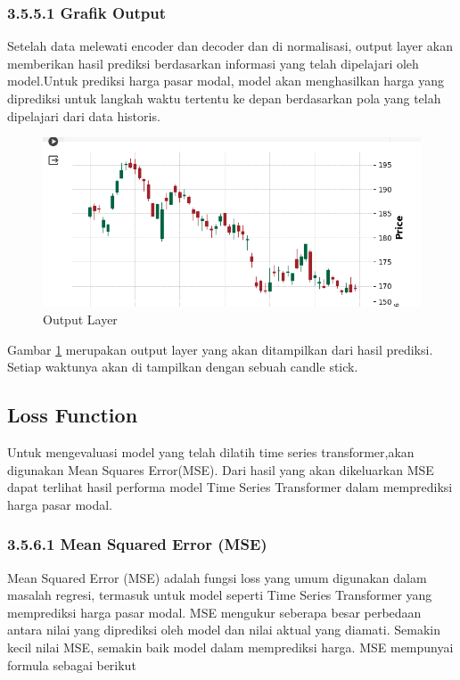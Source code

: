 \subsubsection*{3.5.5.1 Grafik Output}
Setelah data melewati encoder dan decoder dan di normalisasi, output layer akan memberikan hasil prediksi berdasarkan informasi yang telah dipelajari oleh model.Untuk prediksi harga pasar modal, model akan menghasilkan harga yang diprediksi untuk langkah waktu tertentu ke depan berdasarkan pola yang telah dipelajari dari data historis.

\begin{figure} [H] \centering
    \includegraphics[scale=0.6]{gambar/outputlay.png} 
    \caption{Output Layer}
    \label{fig:outputgraf}
\end{figure}

Gambar \ref{fig:outputgraf} merupakan output layer yang akan ditampilkan dari hasil prediksi. Setiap waktunya akan di tampilkan dengan sebuah candle stick.

\subsection{Loss Function}
Untuk mengevaluasi model yang telah dilatih time series transformer,akan digunakan Mean Squares Error(MSE). Dari hasil yang akan dikeluarkan MSE dapat terlihat hasil performa model Time Series Transformer dalam memprediksi harga pasar modal.

\subsubsection*{3.5.6.1 Mean Squared Error (MSE)}
Mean Squared Error (MSE) adalah fungsi loss yang umum digunakan dalam masalah regresi, termasuk untuk model seperti Time Series Transformer yang memprediksi harga pasar modal. MSE mengukur seberapa besar perbedaan antara nilai yang diprediksi oleh model dan nilai aktual yang diamati. Semakin kecil nilai MSE, semakin baik model dalam memprediksi harga. MSE mempunyai formula sebagai berikut

